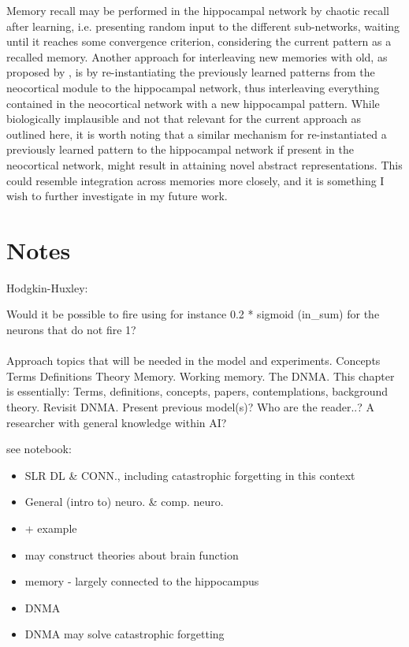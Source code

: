 Memory recall may be performed in the hippocampal network by chaotic recall after learning, i.e. presenting random input to the different sub-networks, waiting until it reaches some convergence criterion, considering the current pattern as a recalled memory. Another approach for interleaving new memories with old, as proposed by \cite{French1997}, is by re-instantiating the previously learned patterns from the neocortical module to the hippocampal network, thus interleaving everything contained in the neocortical network with a new hippocampal pattern. While biologically implausible and not that relevant for the current approach as outlined here, it is worth noting that a similar mechanism for re-instantiated a previously learned pattern to the hippocampal network if present in the neocortical network, might result in attaining novel abstract representations. This could resemble integration across memories more closely, and it is something I wish to further investigate in my future work.

\section{Notes}

Hodgkin-Huxley:

Would it be possible to fire using for instance 0.2 * sigmoid (in\_sum) for the neurons that do not fire 1?
\\\\

Approach topics that will be needed in the model and experiments.
Concepts
Terms
Definitions
Theory
Memory. Working memory.
The DNMA.
This chapter is essentially: Terms, definitions, concepts, papers, contemplations, background theory. Revisit DNMA.
Present previous model(s)?
Who are the reader..? A researcher with general knowledge within AI?

see notebook:

\begin{itemize}
    \item SLR DL \& CONN., including catastrophic forgetting in this context
    \item General (intro to) neuro. \& comp. neuro.
    \item + example
    \item may construct theories about brain function
    \item memory - largely connected to the hippocampus
    \item DNMA
    \item DNMA may solve catastrophic forgetting
\end{itemize}


\cleardoublepage